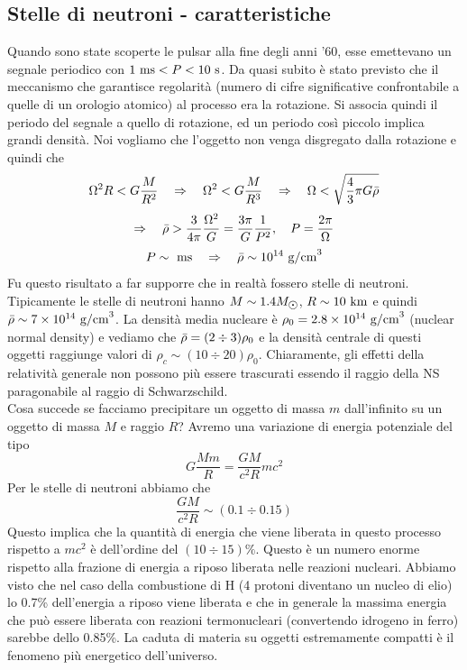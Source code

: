 \subsection*{Stelle di neutroni - caratteristiche}
Quando sono state scoperte le pulsar alla fine degli anni '60, esse emettevano un segnale periodico con $1 \text{ ms} < P < 10 \text{ s}$. Da quasi subito è stato previsto che il meccanismo che garantisce regolarità (numero di cifre significative confrontabile a quelle di un orologio atomico) al processo era la rotazione. Si associa quindi il periodo del segnale a quello di rotazione, ed un periodo così piccolo implica grandi densità. Noi vogliamo che l'oggetto non venga disgregato dalla rotazione e quindi che
\[
\Omega^2R < G\frac{M}{R^2}\quad \Rightarrow \quad \Omega^2 < G\frac{M}{R^3}\quad \Rightarrow \quad \Omega < \sqrt{\frac{4}{3}\pi G \Bar{\rho}}
\]
\[
    \Rightarrow \quad \Bar{\rho} > \frac{3}{4\pi} \frac{\Omega^2}{G} = \frac{3\pi}{G}\frac{1}{P^2},\quad P = \frac{2\pi}{\Omega}
\]
\[
    P \sim \text{ ms}\quad \Rightarrow \quad \Bar{\rho} \sim 10^{14} \text{ g/cm}^3
\]
Fu questo risultato a far supporre che in realtà fossero stelle di neutroni. Tipicamente le stelle di neutroni hanno $M\sim1.4\sunmass$, $R\sim10\text{ km}$ e quindi $\Bar{\rho} \sim 7\times 10^{14}\text{ g/cm}^3$. La densità media nucleare è $\rho_0 = 2.8\times10^{14}\text{ g/cm}^3$ (nuclear normal density) e vediamo che $\Bar{\rho}=(2\div 3)\rho_0$ e la densità centrale di questi oggetti raggiunge valori di $\rho_c\sim (10\div 20)\rho_0$. Chiaramente, gli effetti della relatività generale non possono più essere trascurati essendo il raggio della NS paragonabile al raggio di Schwarzschild.\\
Cosa succede se facciamo precipitare un oggetto di massa $m$ dall'infinito su un oggetto di massa $M$ e raggio $R$? Avremo una variazione di energia potenziale del tipo
\[ 
G\frac{Mm}{R} = \frac{GM}{c^2R}mc^2
\]
Per le stelle di neutroni abbiamo che
\[
    \frac{GM}{c^2R}\sim (0.1\div0.15)
\]
Questo implica che la quantità di energia che viene liberata in questo processo rispetto a $mc^2$ è dell'ordine del $(10\div15)\%$. Questo è un numero enorme rispetto alla frazione di energia a riposo liberata nelle reazioni nucleari. Abbiamo visto che nel caso della combustione di H (4 protoni diventano un nucleo di elio) lo 0.7\% dell'energia a riposo viene liberata e che in generale la massima energia che può essere liberata con reazioni termonucleari (convertendo idrogeno in ferro) sarebbe dello 0.85\%. La caduta di materia su oggetti estremamente compatti è il fenomeno più energetico dell'universo.

